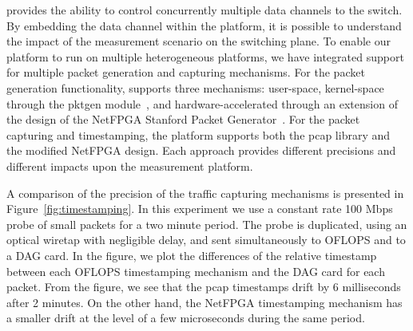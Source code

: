 \oflops provides the ability to control concurrently multiple data
channels to the switch. By embedding the data channel within the
platform, it is possible to understand the impact of the measurement
scenario on the switching plane. To enable our platform to run on
multiple heterogeneous platforms, we have integrated support for
multiple packet generation and capturing mechanisms. For the packet
generation functionality, \oflops supports three mechanisms:
user-space, kernel-space through the pktgen module~\cite{pktgen}, and
hardware-accelerated through an extension of the design of the NetFPGA
Stanford Packet Generator~\cite{Covington09}.  For the packet
capturing and timestamping, the platform supports both the pcap
library and the modified NetFPGA design. Each approach provides
different precisions and different impacts upon the measurement
platform.

A comparison of the precision of the traffic capturing mechanisms is 
presented in Figure~\ref{fig:timestamping}. In this experiment we 
use a constant rate 100 Mbps probe of small packets for a two minute 
period. The probe is duplicated, using an optical wiretap with negligible 
delay, and sent simultaneously to OFLOPS and to a DAG card. In the figure, 
we plot the differences of the relative timestamp between each OFLOPS 
timestamping mechanism and the DAG card for each packet. From the figure, 
we see that the pcap timestamps drift by 6 milliseconds after 2 minutes.
On the other hand, the NetFPGA timestamping mechanism has a smaller
drift at the level of a few microseconds during the same period.

